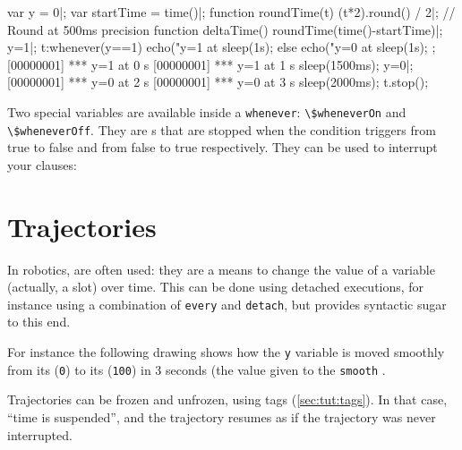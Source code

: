 \begin{urbiscript}
var y = 0|;
var startTime = time()|;
function roundTime(t) { (t*2).round() / 2}|; // Round at 500ms precision
function deltaTime() {roundTime(time()-startTime)}|;
y=1|;
t:whenever(y==1)
{
  echo("y=1 at %
  sleep(1s);
}
else
{
  echo("y=0 at %
  sleep(1s);
};
[00000001] *** y=1 at 0 s
[00000001] *** y=1 at 1 s
sleep(1500ms);
y=0|;
[00000001] *** y=0 at 2 s
[00000001] *** y=0 at 3 s
sleep(2000ms);
t.stop();
\end{urbiscript}

Two special variables are available inside a \lstinline{whenever}:
\lstinline{\$wheneverOn} and \lstinline{\$wheneverOff}. They are
s that are stopped when the condition triggers from true to false
and from false to true respectively. They can be used to interrupt your clauses:



\section{Trajectories}
\label{sec:lang:traj}

In robotics,  are often used: they are a
means to change the value of a variable (actually, a slot) over time.
This can be done using detached executions, for instance using a
combination of \lstinline{every} and \lstinline{detach}, but \us
provides syntactic sugar to this end.

For instance the following drawing shows how the \lstinline{y} variable is
moved smoothly from its  (\lstinline|0|) to its
 (\lstinline|100|) in 3 seconds (the value given to the
\lstinline{smooth} .


Trajectories can be frozen and unfrozen, using tags
(\autoref{sec:tut:tags}).  In that case, ``time is suspended'', and
the trajectory resumes as if the trajectory was never interrupted.


